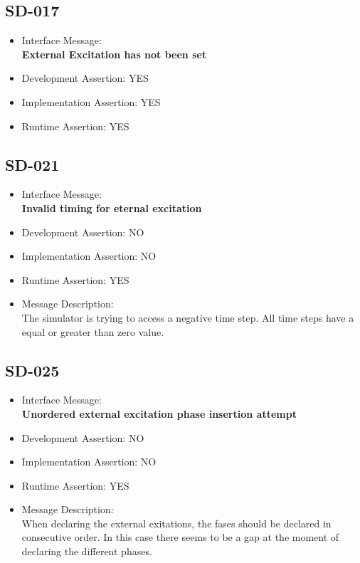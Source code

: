 \subsection{SD-017}
\begin{itemize}
  \item Interface Message:\\[1em]
    \textbf{External Excitation has not been set}
  \item Development Assertion: YES
  \item Implementation Assertion: YES
  \item Runtime Assertion: YES
\end{itemize}

\subsection{SD-021}
\begin{itemize}
  \item Interface Message:\\[1em]
    \textbf{Invalid timing for eternal excitation}
  \item Development Assertion: NO
  \item Implementation Assertion: NO
  \item Runtime Assertion: YES
  \item Message Description:\\[1em]
    The simulator is trying to access a negative time step. All time steps have a equal or greater than zero value.
\end{itemize}

\subsection{SD-025}
\begin{itemize}
  \item Interface Message:\\[1em]
    \textbf{Unordered external excitation phase insertion attempt}
  \item Development Assertion: NO
  \item Implementation Assertion: NO
  \item Runtime Assertion: YES
  \item Message Description:\\[1em]
    When declaring the external exitations, the fases should be declared in consecutive order. In this case there seems to be a gap at the moment of declaring the different phases.
\end{itemize}


